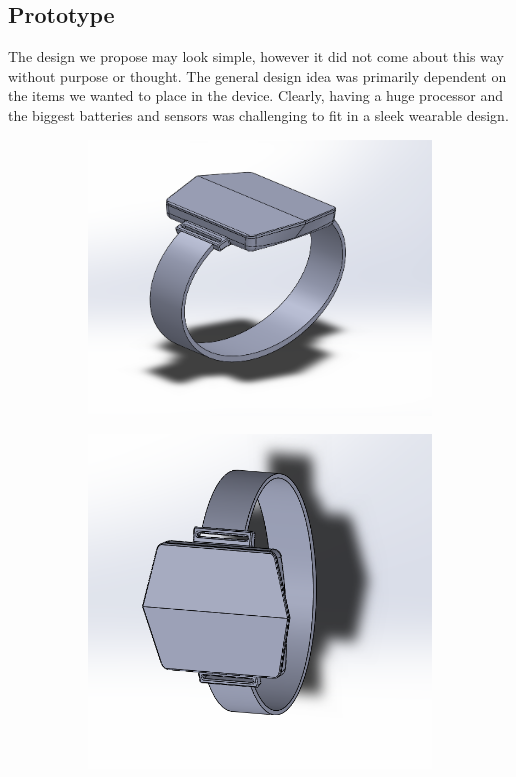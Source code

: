 \documentclass[12pt,letterpaper]{article}
\begin{document}
\subsection*{Prototype}
\hspace{1cm}The design we propose may look simple, however it did not come about this way without purpose or thought. The general design idea was primarily dependent on the items we wanted to place in the device. Clearly, having a huge processor and the biggest batteries and sensors was challenging to fit in a sleek wearable design.\\

\begin{figure}
	\centering
	\begin{subfigure}{.5\textwidth}
		\centering
		\includegraphics[width=1\linewidth]{CaptureV1.png}
		\label{fig:sub1}
	\end{subfigure}%
	\begin{subfigure}{.5\textwidth}
		\centering
		\includegraphics[width=1\linewidth]{CaptureV5.png}

\end{subfigure}
\end{figure}
\end{document}
